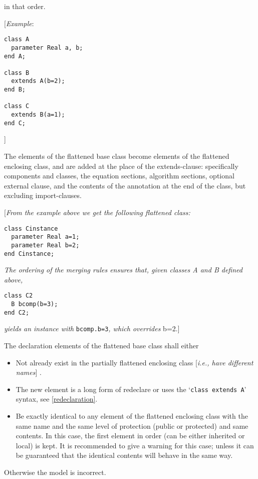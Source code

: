 in that order.

{[}\emph{Example}:
\begin{lstlisting}[language=modelica]
class A
  parameter Real a, b;
end A;

class B
  extends A(b=2);
end B;

class C
  extends B(a=1);
end C;
\end{lstlisting}
{]}

The elements of the flattened base class become elements of the
flattened enclosing class, and are added at the place of the
extends-clause: specifically components and classes, the equation
sections, algorithm sections, optional external clause, and the contents
of the annotation at the end of the class, but excluding import-clauses.

{[}\emph{From the example above we get the following flattened class:}
\begin{lstlisting}[language=modelica]
class Cinstance
  parameter Real a=1;
  parameter Real b=2;
end Cinstance;
\end{lstlisting}

\emph{The ordering of the merging rules ensures that, given classes A
and B defined above, }
\begin{lstlisting}[language=modelica]
class C2
  B bcomp(b=3);
end C2;
\end{lstlisting}

\emph{yields an instance with} \lstinline!bcomp.b=3!\emph{, which overrides} b=2.{]}

The declaration elements of the flattened base class shall either

\begin{itemize}
\item
  Not already exist in the partially flattened enclosing class
  {[}\emph{i.e., have different names}{]} .
\item
  The new element is a long form of redeclare or uses the `\lstinline!class extends A!' syntax, see \autoref{redeclaration}.
\item
  Be exactly identical to any element of the flattened enclosing class
  with the same name and the same level of protection (public or
  protected) and same contents. In this case, the first element in order
  (can be either inherited or local) is kept. It is recommended to give
  a warning for this case; unless it can be guaranteed that the
  identical contents will behave in the same way.
\end{itemize}

Otherwise the model is incorrect.

